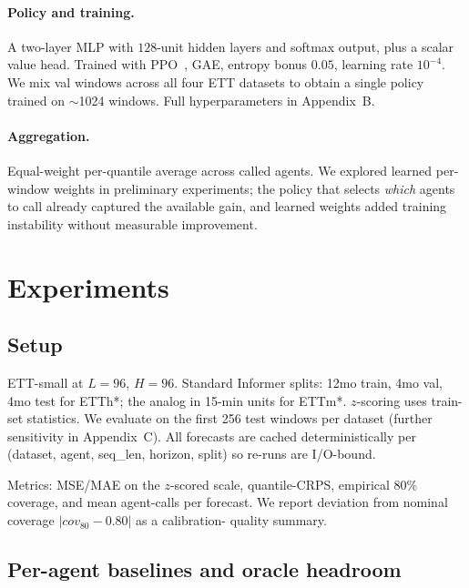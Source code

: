\documentclass{article}
\begin{document}
\paragraph{Policy and training.}
A two-layer MLP with $128$-unit hidden layers and softmax output, plus
a scalar value head. Trained with PPO~\cite{schulman2017ppo}, GAE,
entropy bonus $0.05$, learning rate $10^{-4}$. We mix val windows
across all four ETT datasets to obtain a single policy trained on
$\sim$1024 windows. Full hyperparameters in Appendix~B.

\paragraph{Aggregation.}
Equal-weight per-quantile average across called agents. We explored
learned per-window weights in preliminary experiments; the policy
that selects \emph{which} agents to call already captured the
available gain, and learned weights added training instability
without measurable improvement.

\section{Experiments}
\label{sec:experiments}

\subsection{Setup}
ETT-small at $L=96$, $H=96$. Standard Informer splits: 12mo train,
4mo val, 4mo test for ETTh*; the analog in 15-min units for ETTm*.
$z$-scoring uses train-set statistics. We evaluate on the first 256
test windows per dataset (further sensitivity in Appendix~C). All
forecasts are cached deterministically per (dataset, agent, seq\_len,
horizon, split) so re-runs are I/O-bound.

Metrics: MSE/MAE on the $z$-scored scale, quantile-CRPS, empirical
80\% coverage, and mean agent-calls per forecast. We report
deviation from nominal coverage $|cov_{80} - 0.80|$ as a calibration-
quality summary.

\subsection{Per-agent baselines and oracle headroom}
\label{sec:headroom}
\end{document}
